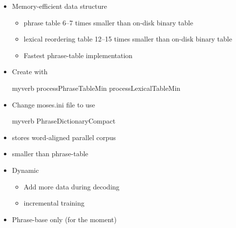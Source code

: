 \documentclass[landscape]{uedslides2C}
\begin{document}

\begin{itemize}
\item Memory-efficient data structure
\begin{itemize}
\item phrase table 6--7 times smaller than on-disk binary table
\item lexical reordering table 12--15 times smaller than on-disk binary table
\item Fastest phrase-table implementation
\end{itemize}
\item Create with
\begin{center}
\begin{SaveVerbatim}{myverb} 
processPhraseTableMin
processLexicalTableMin
\end{SaveVerbatim}
\colorbox{gray}{}
\end{center}
\item Change moses.ini file to use
\begin{center}
\begin{SaveVerbatim}{myverb} 
PhraseDictionaryCompact
\end{SaveVerbatim}
\colorbox{gray}{}
\end{center}
\end{itemize}




\begin{itemize}
  \item stores word-aligned parallel corpus
  \item smaller than phrase-table
  \item Dynamic
    \begin{itemize}
    \item Add more data during decoding
    \item incremental training
    \end{itemize}
  \item Phrase-base only (for the moment)
\end{itemize}

\end{document}
